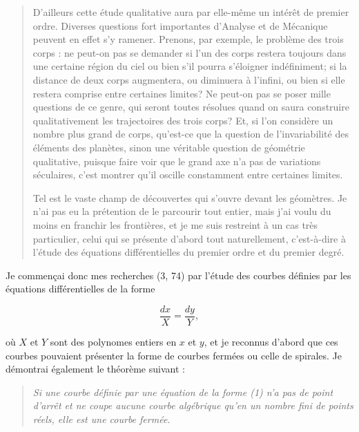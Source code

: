 \documentclass[11pt]{article}
\begin{document}
\begin{quote}
D’ailleurs cette étude qualitative aura par elle-même un intérêt de premier ordre. Diverses questions fort importantes d’Analyse et de Mécanique peuvent en effet s’y ramener. Prenons, par exemple, le problème des trois corps : ne peut-on pas se demander si l’un des corps restera toujours dans une certaine région du ciel ou bien s’il pourra s’éloigner indéfiniment; si la distance de deux corps augmentera, ou diminuera à l’infini, ou bien si elle restera comprise entre certaines limites? Ne peut-on pas se poser mille questions de ce genre, qui seront toutes résolues quand on saura construire qualitativement les trajectoires des trois corps? Et, si l’on considère un nombre plus grand de corps, qu’est-ce que la question de l’invariabilité des éléments des planètes, sinon une véritable question de géométrie qualitative, puisque faire voir que le grand axe n’a pas de variations séculaires, c’est montrer qu’il oscille constamment entre certaines limites.

Tel est le vaste champ de découvertes qui s’ouvre devant les géomètres. Je n’ai pas eu la prétention de le parcourir tout entier, mais j’ai voulu du moins en franchir les frontières, et je me suis restreint à un cas très particulier, celui qui se présente d’abord tout naturellement, c’est-à-dire à l’étude des équations différentielles du premier ordre et du premier degré. \fg{}
\end{quote}

Je commençai donc mes recherches (3, 74) par l’étude des courbes définies par les équations différentielles de la forme

\begin{equation*}
\frac{dx}{X}=\frac{dy}{Y},
\tag{1}
\end{equation*}

où $X$ et $Y$ sont des polynomes entiers en $x$ et $y$, et je reconnus d’abord que ces courbes pouvaient présenter la forme de courbes fermées ou celle de spirales. Je démontrai également le théorème suivant :

\begin{quote}
\emph{Si une courbe définie par une équation de la forme (1) n’a pas de point d’arrêt et ne coupe aucune courbe algébrique qu’en un nombre fini de points réels, elle est une courbe fermée.}
\end{quote}
\end{document}
